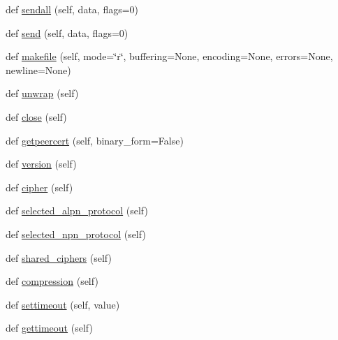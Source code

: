 \begin{DoxyCompactItemize}
\item 
def \hyperlink{classpip_1_1__vendor_1_1urllib3_1_1util_1_1ssltransport_1_1SSLTransport_a3b8d0e0b5dd03653f664beb30d6d7cbd}{sendall} (self, data, flags=0)
\item 
def \hyperlink{classpip_1_1__vendor_1_1urllib3_1_1util_1_1ssltransport_1_1SSLTransport_aa73bada90e50687b906be549f6dee2d2}{send} (self, data, flags=0)
\item 
def \hyperlink{classpip_1_1__vendor_1_1urllib3_1_1util_1_1ssltransport_1_1SSLTransport_a14bae6c25f1a867d7fdbafcf0ab3143c}{makefile} (self, mode=\char`\"{}r\char`\"{}, buffering=None, encoding=None, errors=None, newline=None)
\item 
def \hyperlink{classpip_1_1__vendor_1_1urllib3_1_1util_1_1ssltransport_1_1SSLTransport_acf6ba31d48ee848b86b80d59639c2320}{unwrap} (self)
\item 
def \hyperlink{classpip_1_1__vendor_1_1urllib3_1_1util_1_1ssltransport_1_1SSLTransport_ac36526ef3319bab8e3bb221490ca83fc}{close} (self)
\item 
def \hyperlink{classpip_1_1__vendor_1_1urllib3_1_1util_1_1ssltransport_1_1SSLTransport_a95eefc8190cd84ba29e886779d710b4a}{getpeercert} (self, binary\+\_\+form=False)
\item 
def \hyperlink{classpip_1_1__vendor_1_1urllib3_1_1util_1_1ssltransport_1_1SSLTransport_a51f8748cf15d48f45d8386689b8c3dd7}{version} (self)
\item 
def \hyperlink{classpip_1_1__vendor_1_1urllib3_1_1util_1_1ssltransport_1_1SSLTransport_a56e5bd4e72d660adae4ed2bc90aad26b}{cipher} (self)
\item 
def \hyperlink{classpip_1_1__vendor_1_1urllib3_1_1util_1_1ssltransport_1_1SSLTransport_a07203d5f72266fbcc6d139706f8d5855}{selected\+\_\+alpn\+\_\+protocol} (self)
\item 
def \hyperlink{classpip_1_1__vendor_1_1urllib3_1_1util_1_1ssltransport_1_1SSLTransport_a7cb2aca62a3ab02b41a263f4ac0f4aba}{selected\+\_\+npn\+\_\+protocol} (self)
\item 
def \hyperlink{classpip_1_1__vendor_1_1urllib3_1_1util_1_1ssltransport_1_1SSLTransport_a0e0f2092136ea2767271a31aa589e152}{shared\+\_\+ciphers} (self)
\item 
def \hyperlink{classpip_1_1__vendor_1_1urllib3_1_1util_1_1ssltransport_1_1SSLTransport_a5c38b7bd883da96506620ad4e464945f}{compression} (self)
\item 
def \hyperlink{classpip_1_1__vendor_1_1urllib3_1_1util_1_1ssltransport_1_1SSLTransport_a8ac4eb89709dec6e8077d275a0f359ee}{settimeout} (self, value)
\item 
def \hyperlink{classpip_1_1__vendor_1_1urllib3_1_1util_1_1ssltransport_1_1SSLTransport_a7f0a4920394704c7bedd3cb0207dd25a}{gettimeout} (self)
\end{DoxyCompactItemize}
